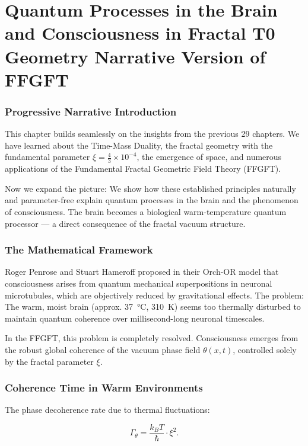 \chapter{Quantum Processes in the Brain and Consciousness in Fractal T0 Geometry  Narrative Version of FFGFT}


	
	\subsection*{Progressive Narrative Introduction}
	
	This chapter builds seamlessly on the insights from the previous 29 chapters. We have learned about the Time-Mass Duality, the fractal geometry with the fundamental parameter \(\xi = \frac{4}{3} \times 10^{-4}\), the emergence of space, and numerous applications of the Fundamental Fractal Geometric Field Theory (FFGFT).
	
	Now we expand the picture: We show how these established principles naturally and parameter-free explain quantum processes in the brain and the phenomenon of consciousness. The brain becomes a biological warm-temperature quantum processor — a direct consequence of the fractal vacuum structure.
	
	\subsection*{The Mathematical Framework}
	
	Roger Penrose and Stuart Hameroff proposed in their Orch-OR model that consciousness arises from quantum mechanical superpositions in neuronal microtubules, which are objectively reduced by gravitational effects. The problem: The warm, moist brain (approx. \SI{37}{\celsius}, \SI{310}{K}) seems too thermally disturbed to maintain quantum coherence over millisecond-long neuronal timescales.
	
	In the FFGFT, this problem is completely resolved. Consciousness emerges from the robust global coherence of the vacuum phase field \(\theta(x,t)\), controlled solely by the fractal parameter \(\xi\).
	
	\subsection*{Coherence Time in Warm Environments}
	
	The phase decoherence rate due to thermal fluctuations:
	
	\begin{equation}
		\Gamma_{\theta} = \frac{k_B T}{\hbar} \cdot \xi^2.
	\end{equation}
	
